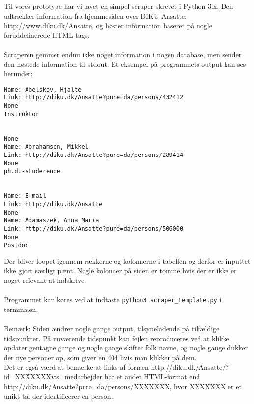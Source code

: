 \documentclass[11pt]{article}
\begin{document}
Til vores prototype har vi lavet en simpel scraper skrevet i Python 3.x. Den udtrækker information fra hjemmesiden over DIKU Ansatte: \url{http://www.diku.dk/Ansatte}, og høster information baseret på nogle foruddefinerede HTML-tags.\\
\\
Scraperen gemmer endnu ikke noget information i nogen database, men sender den høstede information til stdout. Et eksempel på programmets output kan ses herunder:
\begin{lstlisting}
Name: Abelskov, Hjalte
Link: http://diku.dk/Ansatte?pure=da/persons/432412
None
Instruktor


None
Name: Abrahamsen, Mikkel
Link: http://diku.dk/Ansatte?pure=da/persons/289414
None
ph.d.-studerende


Name: E-mail
Link: http://diku.dk/Ansatte
None
Name: Adamaszek, Anna Maria
Link: http://diku.dk/Ansatte?pure=da/persons/506000
None
Postdoc
\end{lstlisting}
Der bliver loopet igennem rækkerne og kolonnerne i tabellen og derfor er inputtet ikke gjort særligt pænt. Nogle kolonner på siden er tomme hvis der er ikke er noget relevant at indskrive.\\
\\
Programmet kan køres ved at indtaste \texttt{python3 scraper\_template.py} i terminalen.\\
\\
Bemærk: Siden ændrer nogle gange output, tilsyneladende på tilfældige tidspunkter. På nuværende tidspunkt kan fejlen reproduceres ved at klikke opdater gentagne gange og nogle gange skifter folk navne, og nogle gange dukker der nye personer op, som giver en 404 hvis man klikker på dem.\\
Det er også værd at bemærke at links af formen http://diku.dk/Ansatte/?id=XXXXXXXvis=medarbejder har et andet HTML-format end http://diku.dk/Ansatte?pure=da/persons/XXXXXXX, hvor XXXXXXX er et unikt tal der identificerer en person.\\
\end{document}
